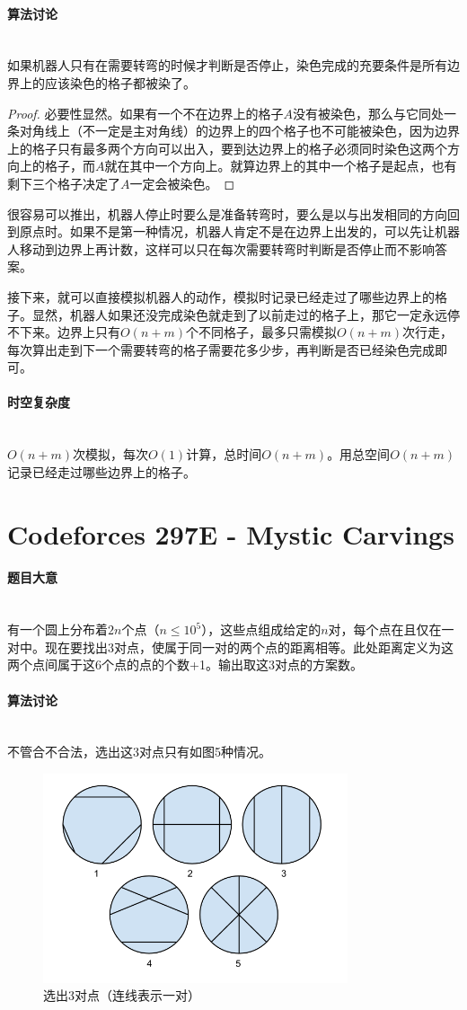 \documentclass[UTF8]{ctexart}
\newcommand{\myparagraph}[1]{\paragraph{#1}\mbox{}\\}
\theoremstyle{nonumberplain}
\newtheorem{proof}{\hspace{1em}证明：}
\begin{document}
		\myparagraph{算法讨论}
		
			如果机器人只有在需要转弯的时候才判断是否停止，染色完成的充要条件是所有边界上的应该染色的格子都被染了。
			
			\begin{proof}必要性显然。如果有一个不在边界上的格子$A$没有被染色，那么与它同处一条对角线上（不一定是主对角线）的边界上的四个格子也不可能被染色，因为边界上的格子只有最多两个方向可以出入，要到达边界上的格子必须同时染色这两个方向上的格子，而$A$就在其中一个方向上。就算边界上的其中一个格子是起点，也有剩下三个格子决定了$A$一定会被染色。\end{proof}
			
			很容易可以推出，机器人停止时要么是准备转弯时，要么是以与出发相同的方向回到原点时。如果不是第一种情况，机器人肯定不是在边界上出发的，可以先让机器人移动到边界上再计数，这样可以只在每次需要转弯时判断是否停止而不影响答案。
			
			接下来，就可以直接模拟机器人的动作，模拟时记录已经走过了哪些边界上的格子。显然，机器人如果还没完成染色就走到了以前走过的格子上，那它一定永远停不下来。边界上只有$O(n+m)$个不同格子，最多只需模拟$O(n+m)$次行走，每次算出走到下一个需要转弯的格子需要花多少步，再判断是否已经染色完成即可。
			
		\myparagraph{时空复杂度}
		
			$O(n+m)$次模拟，每次$O(1)$计算，总时间$O(n+m)$。用总空间$O(n+m)$记录已经走过哪些边界上的格子。
	
	\section{Codeforces 297E - Mystic Carvings}
	
		\myparagraph{题目大意}
		
			有一个圆上分布着$2n$个点（$n \leq 10^5$），这些点组成给定的$n$对，每个点在且仅在一对中。现在要找出3对点，使属于同一对的两个点的距离相等。此处距离定义为这两个点间属于这6个点的点的个数+1。输出取这3对点的方案数。
		
		\myparagraph{算法讨论}
		
			不管合不合法，选出这3对点只有如图5种情况。
			
			\begin{figure}[ht]
				\centering
				\includegraphics[width=0.8\textwidth]{fig297e_1.png}
				\caption{选出3对点（连线表示一对）}
			\end{figure}
			
\end{document}

